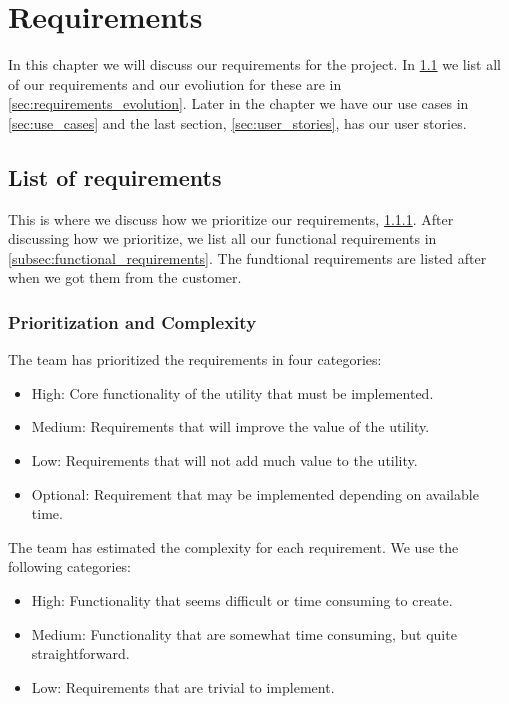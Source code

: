 \documentclass{report}
\begin{document}
\chapter{Requirements} \label{cha:requirements}
In this chapter we will discuss our requirements for the project. In \ref{sec:list_of_requirements} we list all of our requirements and our evoliution for these are in \ref{sec:requirements_evolution}. Later in the chapter we have our use cases in \ref{sec:use_cases} and the last section, \ref{sec:user_stories}, has our user stories.
\section{List of requirements} \label{sec:list_of_requirements}
This is where we discuss how we prioritize our requirements, \ref{subsec:prioritization_and_complexity}. After discussing how we prioritize, we list all our functional requirements in \ref{subsec:functional_requirements}. The fundtional requirements are listed after when we got them from the customer.
\subsection{Prioritization and Complexity} \label{subsec:prioritization_and_complexity}
The team has prioritized the requirements in four categories:
\begin{itemize}
    \item High: Core functionality of the utility that must be implemented.
    \item Medium: Requirements that will improve the value of the utility.
    \item Low: Requirements that will not add much value to the utility.
    \item Optional: Requirement that may be implemented depending on available time.
\end{itemize}
The team has estimated the complexity for each requirement. We use the following categories:
\begin{itemize}
    \item High: Functionality that seems difficult or time consuming to create.
    \item Medium: Functionality that are somewhat time consuming, but quite straightforward.
    \item Low: Requirements that are trivial to implement.
\end{itemize}   
\end{document}
